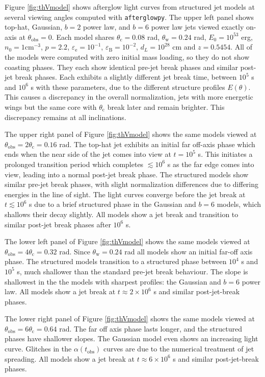 \documentclass[twocolumn]{aastex62}
\newcommand{\afterglowpy}{{\tt afterglowpy}}
\newcommand{\tobs}{\ensuremath{t_{\mathrm{obs}}}}
\newcommand{\thobs}{\ensuremath{\theta_{\mathrm{obs}}}}
\newcommand{\thW}{\ensuremath{\theta_{\mathrm{w}}}}
\newcommand{\thC}{\ensuremath{\theta_{\mathrm{c}}}}
\newcommand{\epse}{\ensuremath{\varepsilon_{\mathrm{e}}}}
\newcommand{\epsB}{\ensuremath{\varepsilon_{\mathrm{B}}}}
\begin{document}
Figure \ref{fig:thVmodel} shows afterglow light curves from structured jet models at several viewing angles computed with \afterglowpy{}.  The upper left panel shows top-hat, Gaussian, $b=2$ power law, and $b=6$ power law jets viewed exactly on-axis at $\thobs=0$.  Each model shares $\thC=0.08$ rad, $\thW=0.24$ rad, $E_0=10^{53}$ erg, $n_0 = 1$cm$^{-3}$, $p=2.2$, $\epse=10^{-1}$, $\epsB = 10^{-2}$, $d_L=10^{28}$ cm and $z=0.5454$.  All of the models were computed with zero initial mass loading, so they do not show coasting phases.  They each show identical pre-jet break phases and similar post-jet break phases.  Each exhibits a slightly different jet break time, between $10^5$ s and $10^6$ s with these parameters, due to the different structure profiles $E(\theta)$.  This causes a discrepancy in the overall normalization, jets with more energetic wings but the same core with $\thC$ break later and remain brighter.  This discrepancy remains at all inclinations.

The upper right panel of Figure \ref{fig:thVmodel} shows the same models viewed at $\thobs=2\thC=0.16$ rad.  The top-hat jet exhibits an initial far off-axis phase which ends when the near side of the jet comes into view at $t=10^5$ s.  This initiates a prolonged transition period which completes  $\lesssim 10^6$ s as the far edge comes into view, leading into a normal post-jet break phase.  The structured models show similar pre-jet break phases, with slight normalization differences due to differing energies in the line of sight.  The light curves converge before the jet break at $t \lesssim 10^6$ s due to a brief structured phase in the Gaussian and $b=6$ models, which shallows their decay slightly.   All models show a jet break and transition to similar post-jet break phases after $10^6$ s.

The lower left panel of Figure \ref{fig:thVmodel} shows the same models viewed at $\thobs=4\thC=0.32$ rad.  Since $\thW=0.24$ rad all models show an initial far-off axis phase.  The structured models transition to a structured phase between $10^4$ s and $10^5$ s, much shallower than the standard pre-jet break behaviour.  The slope is shallowest in the the models with sharpest profiles: the Gaussian and $b=6$ power law.  All models show a jet break at $t\approx 2\times 10^6$ s and similar post-jet-break phases.

The lower right panel of Figure \ref{fig:thVmodel} shows the same models viewed at $\thobs=6\thC=0.64$ rad.  The far off axis phase lasts longer, and the structured phases have shallower slopes.  The Gaussian model even shows an increasing light curve.  Glitches in the $\alpha(\tobs)$ curves are due to the numerical treatment of jet spreading.  All models show a jet break at $t\approx 6\times 10^6$ s and similar post-jet-break phases.
\end{document}

